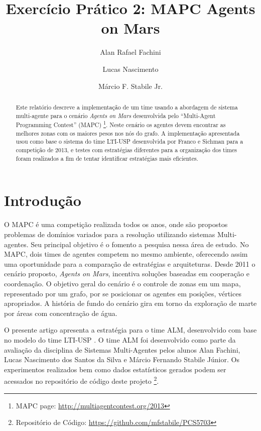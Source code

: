 \documentclass{llncs}
\begin{document}
\title{Exercício Prático 2: MAPC Agents on Mars}

\author{Alan Rafael Fachini \and Lucas Nascimento \and Márcio F. Stabile Jr.}

\maketitle

\begin{abstract}
Este relatório descreve a implementação de um time usando a abordagem de sistema multi-agente para o cenário \textit{Agents on Mars} desenvolvida pelo ``Multi-Agent Programming Contest'' (MAPC) \footnote{MAPC page: \url{http://multiagentcontest.org/2013}}. Neste cenário os agentes devem encontrar as melhores zonas com os maiores pesos nos nós do grafo. A implementação apresentada usou como base o sistema do time LTI-USP desenvolvida por Franco e Sichman \cite{franco2013improving} para a competição de 2013, e testes com estratégias diferentes para a organização dos times foram realizados a fim de tentar identificar estratégias mais eficientes.
\end{abstract}

\section{Introdução}

O MAPC é uma competição realizada todos os anos, onde são propostos problemas de domínios variados para a resolução utilizando sistemas Multi-agentes. Seu principal objetivo é o fomento a pesquisa nessa área de estudo. No MAPC, dois times de agentes competem no mesmo ambiente, oferecendo assim uma oportunidade para a comparação de estratégias e arquiteturas. Desde 2011 o cenário proposto, \textit{Agents on Mars}, incentiva soluções baseadas em cooperação e coordenação. O objetivo geral do cenário é o controle de zonas em um mapa, representado por um grafo, por se posicionar os agentes em posições, vértices apropriados. A história de fundo do cenário gira em torno da exploração de marte por áreas com concentração de água.

O presente artigo apresenta a estratégia para o time ALM, desenvolvido com base no modelo do time LTI-USP \cite{franco2013comparing}\cite{franco2013improving}\cite{ltiusp2012}. O time ALM foi desenvolvido como parte da avaliação da disciplina de Sistemas Multi-Agentes pelos alunos Alan Fachini, Lucas Nascimento dos Santos da Silva e Márcio Fernando Stabile Júnior. Os experimentos realizados bem como dados estatísticos gerados podem ser acessados no repositório de código deste projeto \footnote{Repositório de Código: \url{https://github.com/mfstabile/PCS5703}}.
\end{document}
